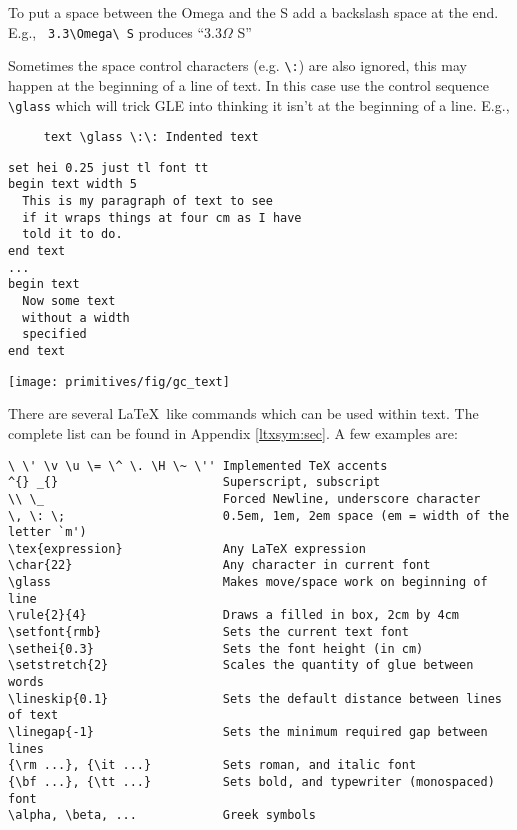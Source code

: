 \begin{commanddescription}
To put a space between the Omega and the S add a
backslash space at the end. E.g.,  \verb+ 3.3\Omega\ S+
produces ``3.3$\Omega$ S''

Sometimes the space control characters (e.g. \verb+\:+)
are also ignored, this may
happen at the beginning of a line of text. In this case use the
control sequence \verb+\glass+ which will trick GLE into
thinking it isn't at the beginning of a line. E.g.,

\preglecode{}
\begin{Verbatim}
     text \glass \:\: Indented text
\end{Verbatim}
\postglecode{}

\begin{minipage}[c]{8cm}
\begin{Verbatim}
set hei 0.25 just tl font tt
begin text width 5
  This is my paragraph of text to see
  if it wraps things at four cm as I have 
  told it to do.
end text 
...
begin text 
  Now some text 
  without a width
  specified
end text 
\end{Verbatim}
\end{minipage}
\hfill
\begin{minipage}[c]{7cm}
\mbox{\texttt{[image: primitives/fig/gc\_text]}}
\end{minipage}

  
  
  
  
 \index{\LaTeX} There are several \LaTeX \ like commands which can be used within text. The complete list can be found in Appendix \ref{ltxsym:sec}. A few examples are:

\begin{Verbatim}
\ \' \v \u \= \^ \. \H \~ \'' Implemented TeX accents
^{} _{}                       Superscript, subscript
\\ \_                         Forced Newline, underscore character
\, \: \;                      0.5em, 1em, 2em space (em = width of the letter `m')
\tex{expression}              Any LaTeX expression
\char{22}                     Any character in current font
\glass                        Makes move/space work on beginning of line
\rule{2}{4}                   Draws a filled in box, 2cm by 4cm
\setfont{rmb}                 Sets the current text font
\sethei{0.3}                  Sets the font height (in cm)
\setstretch{2}                Scales the quantity of glue between words
\lineskip{0.1}                Sets the default distance between lines of text
\linegap{-1}                  Sets the minimum required gap between lines
{\rm ...}, {\it ...}          Sets roman, and italic font
{\bf ...}, {\tt ...}          Sets bold, and typewriter (monospaced) font
\alpha, \beta, ...            Greek symbols
\end{Verbatim}


\end{commanddescription}
